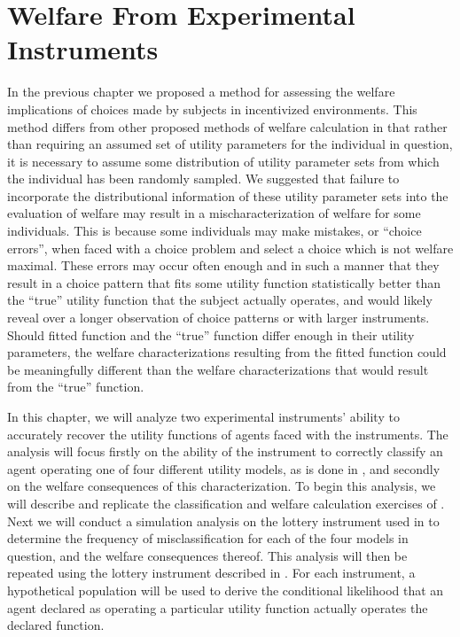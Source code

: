 \documentclass[../main.tex]{subfiles}
\begin{document}
\onehalfspacing
\setcounter{chapter}{3}

\chapter{Welfare From Experimental Instruments}

\lltoc %

In the previous chapter we proposed a method for assessing the welfare implications of choices made by subjects in incentivized environments.
This method differs from other proposed methods of welfare calculation in that rather than requiring an assumed set of utility parameters for the individual in question, it is necessary to assume some distribution of utility parameter sets from which the individual has been randomly sampled.
We suggested that failure to incorporate the distributional information of these utility parameter sets into the evaluation of welfare may result in a mischaracterization of welfare for some individuals.
This is because some individuals may make mistakes, or \enquote{choice errors}, when faced with a choice problem and select a choice which is not welfare maximal.
These errors may occur often enough and in such a manner that they result in a choice pattern that fits some utility function statistically better than the \enquote{true} utility function that the subject actually operates, and would likely reveal over a longer observation of choice patterns or with larger instruments.
Should fitted function and the \enquote{true} function differ enough in their utility parameters, the welfare characterizations resulting from the fitted function could be meaningfully different than the welfare characterizations that would result from the \enquote{true} function.

In this chapter, we will analyze two experimental instruments' ability to accurately recover the utility functions of agents faced with the instruments.
The analysis will focus firstly on the ability of the instrument to correctly classify an agent operating one of four different utility models, as is done in \textcite{Harrison2016}, and secondly on the welfare consequences of this characterization.
To begin this analysis, we will describe and replicate the classification and welfare calculation exercises of \textcite{Harrison2016}.
Next we will conduct a simulation analysis on the lottery instrument used in \textcite{Harrison2016} to determine the frequency of misclassification for each of the four models in question, and the welfare consequences thereof.
This analysis will then be repeated using the lottery instrument described in \textcite{Hey1994}.
For each instrument, a hypothetical population will be used to derive the conditional likelihood that an agent declared as operating a particular utility function actually operates the declared function.
\end{document}
